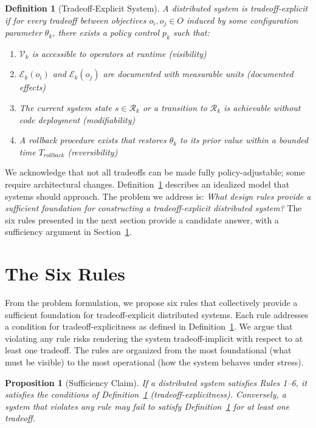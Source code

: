 \documentclass[conference]{IEEEtran}
\newtheorem{definition}[theorem]{Definition}
\newtheorem{proposition}[theorem]{Proposition}
\begin{document}
\begin{definition}[Tradeoff-Explicit System]
\label{def:te}
A distributed system is \textit{tradeoff-explicit} if for every tradeoff between objectives $o_i, o_j \in O$ induced by some configuration parameter $\theta_k$, there exists a policy control $p_k$ such that:
\begin{enumerate}
    \item $\mathcal{V}_k$ is accessible to operators at runtime (visibility)
    \item $\mathcal{E}_k(o_i)$ and $\mathcal{E}_k(o_j)$ are documented with measurable units (documented effects)
    \item The current system state $s \in \mathcal{R}_k$ or a transition to $\mathcal{R}_k$ is achievable without code deployment (modifiability)
    \item A rollback procedure exists that restores $\theta_k$ to its prior value within a bounded time $T_{rollback}$ (reversibility)
\end{enumerate}
\end{definition}

We acknowledge that not all tradeoffs can be made fully policy-adjustable; some require architectural changes. Definition~\ref{def:te} describes an idealized model that systems should approach. The problem we address is: \textit{What design rules provide a sufficient foundation for constructing a tradeoff-explicit distributed system?} The six rules presented in the next section provide a candidate answer, with a sufficiency argument in Section~\ref{sec:rules}.

\section{The Six Rules}
\label{sec:rules}

From the problem formulation, we propose six rules that collectively provide a sufficient foundation for tradeoff-explicit distributed systems. Each rule addresses a condition for tradeoff-explicitness as defined in Definition~\ref{def:te}. We argue that violating any rule risks rendering the system tradeoff-implicit with respect to at least one tradeoff. The rules are organized from the most foundational (what must be visible) to the most operational (how the system behaves under stress).

\begin{proposition}[Sufficiency Claim]
\label{thm:rules_complete}
If a distributed system satisfies Rules 1--6, it satisfies the conditions of Definition~\ref{def:te} (tradeoff-explicitness). Conversely, a system that violates any rule may fail to satisfy Definition~\ref{def:te} for at least one tradeoff.
\end{proposition}
\end{document}
